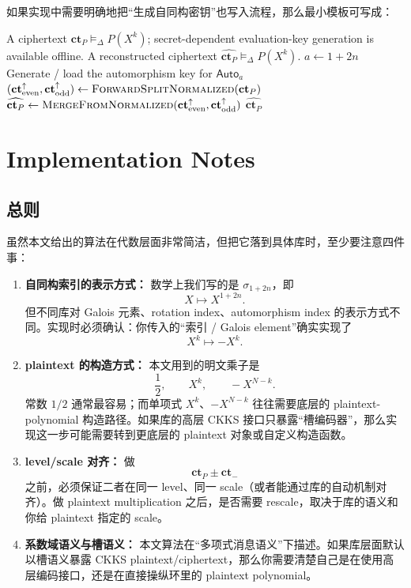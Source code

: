\documentclass[11pt,a4paper]{ctexart}
\newcommand{\Auto}[1]{\mathsf{Auto}_{#1}}
\newcommand{\rep}{\mathrel{\vDash_{\Delta}}}
\newcommand{\ctP}{\mathbf{ct}_{P}}
\newcommand{\ctm}{\mathbf{ct}_{-}}
\newcommand{\cte}{\mathbf{ct}_{\mathrm{even}}^{\uparrow}}
\newcommand{\cto}{\mathbf{ct}_{\mathrm{odd}}^{\uparrow}}
\begin{document}
如果实现中需要明确地把“生成自同构密钥”也写入流程，那么最小模板可写成：

\begin{algorithm}[H]
\caption{EndToEndSplitAndMerge}
\begin{algorithmic}[1]
\Require
A ciphertext \(\ctP \rep P(X^k)\); secret-dependent evaluation-key generation is available offline.
\Ensure
A reconstructed ciphertext \(\widehat{\ctP}\rep P(X^k)\).
\State \(a\gets 1+2n\)
\State Generate / load the automorphism key for \(\Auto{a}\)
\State \((\cte,\cto)\gets \textsc{ForwardSplitNormalized}(\ctP)\)
\State \(\widehat{\ctP}\gets \textsc{MergeFromNormalized}(\cte,\cto)\)
\State \Return \(\widehat{\ctP}\)
\end{algorithmic}
\end{algorithm}

\section{Implementation Notes}

\subsection{总则}

虽然本文给出的算法在代数层面非常简洁，但把它落到具体库时，至少要注意四件事：

\begin{enumerate}[label=(\arabic*)]
    \item \textbf{自同构索引的表示方式：}  
    数学上我们写的是 \(\sigma_{1+2n}\)，即
    \[
    X\mapsto X^{1+2n}.
    \]
    但不同库对 Galois 元素、rotation index、automorphism index 的表示方式不同。实现时必须确认：你传入的“索引 / Galois element”确实实现了
    \[
    X^k \longmapsto -X^k.
    \]

    \item \textbf{plaintext 的构造方式：}  
    本文用到的明文乘子是
    \[
    \frac12,\qquad X^k,\qquad -X^{N-k}.
    \]
    常数 \(1/2\) 通常最容易；而单项式 \(X^k\)、\(-X^{N-k}\) 往往需要底层的 plaintext-polynomial 构造路径。如果库的高层 CKKS 接口只暴露“槽编码器”，那么实现这一步可能需要转到更底层的 plaintext 对象或自定义构造函数。

    \item \textbf{level/scale 对齐：}  
    做
    \[
    \ctP\pm \ctm
    \]
    之前，必须保证二者在同一 level、同一 scale（或者能通过库的自动机制对齐）。做 plaintext multiplication 之后，是否需要 rescale，取决于库的语义和你给 plaintext 指定的 scale。

    \item \textbf{系数域语义与槽语义：}  
    本文算法在“多项式消息语义”下描述。如果库层面默认以槽语义暴露 CKKS plaintext/ciphertext，那么你需要清楚自己是在使用高层编码接口，还是在直接操纵环里的 plaintext polynomial。
\end{enumerate}
\end{document}
